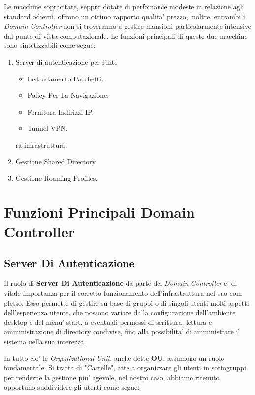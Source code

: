 \documentclass{report}
\begin{document}
			Le macchine sopracitate, seppur dotate di perfomance modeste in relazione agli standard odierni, offrono un ottimo 
			rapporto qualita' prezzo, inoltre, entrambi i \emph{Domain Controller} non si troveranno a gestire mansioni 
			particolarmente intensive dal punto di vista computazionale.
			Le funzioni principali di queste due macchine sono sintetizzabili come segue:
			\begin{enumerate}
				\item Server di autenticazione per l'inte        \begin{itemize}
						\item Instradamento Pacchetti.
						\item Policy Per La Navigazione.
						\item Fornitura Indirizzi IP.
						\item Tunnel VPN.
					\end{itemize}ra infrastruttura.
				\item Gestione Shared Directory.
				\item Gestione Roaming Profiles.
			\end{enumerate}
		\section{Funzioni Principali Domain Controller}
			\subsection{Server Di Autenticazione}
				Il ruolo di \textbf{Server Di Autenticazione} da parte del \emph{Domain Controller} e' di vitale importanza
				per il corretto funzionamento dell'infrastruttura nel suo com-\\plesso. Esso permette di gestire su base di 
				gruppi o di singoli utenti molti aspetti dell'esperienza utente, che possono variare dalla configurazione
				dell'ambiente desktop e del menu' start, a eventuali permessi di scrittura, lettura e amministrazione di
				directory condivise, fino alla possibilita' di amministrare il sistema nella sua interezza.

				In tutto cio' le \emph{Organizational Unit}, anche dette \textbf{OU}, assumono un ruolo fondamentale. Si 
				tratta di "Cartelle", atte a organizzare gli utenti in sottogruppi per renderne la gestione piu' agevole,
				nel nostro caso, abbiamo ritenuto opportuno suddividere gli utenti come segue:
\end{document}
